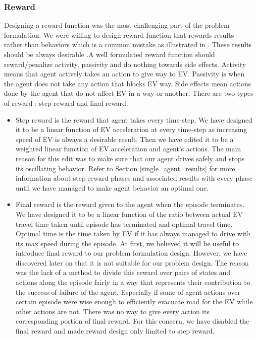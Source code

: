 \subsubsection{Reward}

Designing a reward function was the most challenging part of the problem formulation. We were willing to design reward function that rewards results rather than behaviors which is a common mistake as illustrated in \cite{russell2016artificial}. These results should be always desirable .A well formulated reward function should reward/penalize activity, passivity and do nothing towards side effects. Activity means that agent actively takes an action to give way to EV. Passivity is when the agent does not take any action that blocks EV way. Side effects mean actions done by the agent that do not affect EV in a way or another. There are two types of reward : step reward and final reward.
\begin{itemize}
    \item 
    Step reward is the reward that agent takes every time-step. We have designed it to be a linear function of EV acceleration at every time-step as increasing speed of EV is always a desirable result.  Then we have edited it to be a weighted linear function of EV acceleration and agent’s actions. The main reason for this edit was to make sure that our agent drives safely and stops its oscillating behavior. Refer to Section \ref{single_agent_results} for more information about step reward phases and associated results with every phase until we have managed to make agent behavior an optimal one.
  \item 
  Final reward is the reward given to the agent when the episode terminates. We have designed it to be a linear function of the ratio between actual EV travel time taken until episode has terminated and optimal travel time. Optimal time is the time taken by EV if it has always managed to drive with its max speed during the episode. At first, we believed it will be useful to introduce final reward to our problem formulation design. However, we have discovered later on that it is not suitable for our problem design. The reason was the lack of a method to divide this reward over pairs of states and actions along the episode fairly in a way that represents their contribution to the success of failure of the agent. Especially if some of agent actions over certain episode were wise enough to efficiently evacuate road for the EV while other actions are not. There was no way to give every action its corresponding portion of final reward. For this concern, we have disabled the final reward and  made reward design only limited to step reward.
 

    
\end{itemize}


